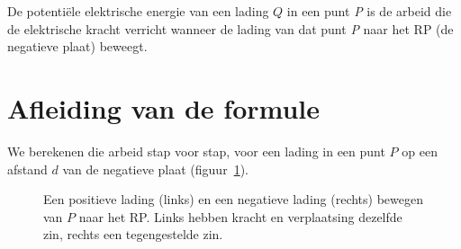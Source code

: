\documentclass{ximera}
\begin{document}
De potentiële elektrische energie van een lading $Q$ in een punt \textit{P} is de arbeid die de elektrische kracht verricht wanneer de lading van dat punt \textit{P} naar het RP (de negatieve plaat) beweegt.

\section{Afleiding van de formule}
We berekenen die arbeid stap voor stap, voor een lading in een punt $P$ op een afstand $d$ van de negatieve plaat (figuur~\ref{fig:afleiding_epot}).

\begin{figure}[h]
    \captionsetup{width=0.85\textwidth}
    \begin{center}
    \end{center}
    \caption{Een positieve lading (links) en een negatieve lading (rechts) bewegen van $P$ naar het RP. Links hebben kracht en verplaatsing dezelfde zin, rechts een tegengestelde zin.}
    \label{fig:afleiding_epot}
\end{figure}
\end{document}
